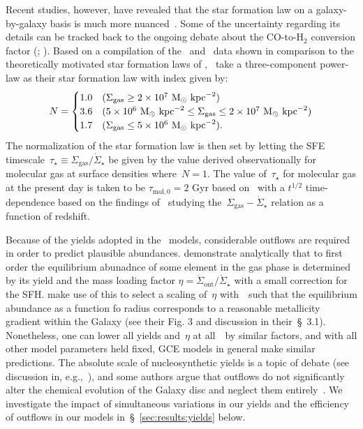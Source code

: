 \documentclass[ms.tex]{subfiles}
\begin{document}
Recent studies, however, have revealed that the star formation law on a
galaxy-by-galaxy basis is much more nuanced~\citep{delosReyes2019, Ellison2021,
Kennicutt2021}.
Some of the uncertainty regarding its details can be tracked back to the
ongoing debate about the CO-to-H$_2$ conversion factor (\citealp{Kennicutt2012};
\citealp*{Liu2015}).
Based on a compilation of the~\citet{Bigiel2010} and~\citet{Leroy2013} data
shown in comparison to the theoretically motivated star formation laws of
\citet[][see their Fig. 2]{Krumholz2018},~\citet{Johnson2021} take a
three-component power-law as their star formation law with index given by:
\begin{equation}
N =
\begin{cases}
1.0 & (\Sigma_\text{gas} \geq 2\times10^7~\text{M}_\odot~\text{kpc}^{-2}) \\
3.6 & (5\times10^6~\text{M}_\odot~\text{kpc}^{-2} \leq \Sigma_\text{gas} \leq
2\times10^7~\text{M}_\odot~\text{kpc}^{-2}) \\
1.7 & (\Sigma_\text{gas} \leq 5\times10^6~\text{M}_\odot~\text{kpc}^{-2}).
\end{cases}
\end{equation}
The normalization of the star formation law is then set by letting the SFE
timescale~$\tau_\star \equiv \Sigma_\text{gas} / \dot{\Sigma}_\star$ be given
by the value derived observationally for molecular gas at surface densities
where~$N = 1$.
The value of~$\tau_\star$ for molecular gas at the present day is taken to be
$\tau_{\text{mol},0} = 2$ Gyr based on~\citet{Leroy2008, Leroy2013} with a
$t^{1/2}$ time-dependence based on the findings of~\citet{Tacconi2018} studying
the~$\Sigma_\text{gas} - \dot{\Sigma}_\star$ relation as a function of
redshift.
\par
Because of the yields adopted in the~\citet{Johnson2021} models, considerable
outflows are required in order to predict plausible abundances.
\citet{Weinberg2017} demonstrate analytically that to first order the
equilibrium abunadnce of some element in the gas phase is determined by its
yield and the mass loading factor
$\eta = \dot{\Sigma}_\text{out} / \dot{\Sigma}_\star$ with a small correction
for the SFH.
\citet{Johnson2021} make use of this to select a scaling of~$\eta$
with~\rgal~such that the equilibrium abundance as a function fo radius
corresponds to a reasonable metallicity gradient within the Galaxy (see their
Fig. 3 and discussion in their~\S~3.1).
Nonetheless, one can lower all yields and~$\eta$ at all~\rgal~by similar
factors, and with all other model parameters held fixed, GCE models in general
make similar predictions.
The absolute scale of nucleosynthetic yields is a topic of debate (see
discussion in, e.g.,~\citealp{Griffith2021}), and some authors argue that
outflows do not significantly alter the chemical evolution of the Galaxy disc
and neglect them entirely~\citep[e.g.][]{Spitoni2019, Spitoni2021}.
We investigate the impact of simultaneous variations in our yields and the
efficiency of outflows in our models in~\S~\ref{sec:results:yields} below.
\end{document}
